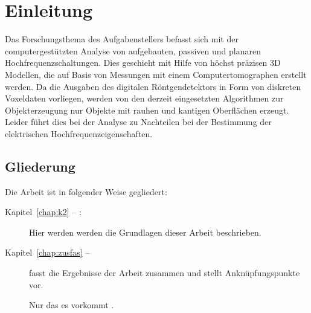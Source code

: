 
\chapter{Einleitung}
Das Forschungsthema des Aufgabenstellers befasst sich mit der computergestützten Analyse von aufgebauten, passiven und planaren Hochfrequenzschaltungen. Dies geschieht mit Hilfe von höchst präzisen 3D Modellen, die auf Basis von Messungen mit einem Computertomographen erstellt werden. Da die Ausgaben des digitalen Röntgendetektors in Form von diskreten Voxeldaten vorliegen, werden von den derzeit eingesetzten Algorithmen zur Objekterzeugung nur Objekte mit rauhen und kantigen Oberflächen erzeugt. Leider führt dies bei der Analyse zu Nachteilen bei der Bestimmung der elektrischen Hochfrequenzeigenschaften.

\section*{Gliederung}
Die Arbeit ist in folgender Weise gegliedert:
\begin{description}
\item[Kapitel~\ref{chap:k2} -- :] Hier werden werden die Grundlagen dieser Arbeit beschrieben.
\item[Kapitel~\ref{chap:zusfas} -- ] fasst die Ergebnisse der Arbeit zusammen und stellt Anknüpfungspunkte vor.

Nur das es vorkommt \cite{WSPA}.
\end{description}
